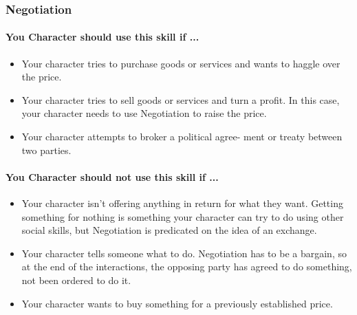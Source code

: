 \begin{multicols}{2}
\subsubsection{Negotiation}\label{skill:negotiation}
\paragraph{You Character should use this skill if ...}
\begin{itemize}
    \item Your character tries to purchase goods or services and wants to haggle
        over the price.
    \item Your character tries to sell goods or services and turn a profit. In
        this case, your character needs to use Negotiation to raise the price.
    \item Your character attempts to broker a political agree- ment or treaty
        between two parties.
\end{itemize}
\paragraph{You Character should not use this skill if ...}
\begin{itemize}
    \item Your character isn't offering anything in return for what they want.
        Getting something for nothing is something your character can try to do
        using other social skills, but Negotiation is predicated on the idea of
        an exchange.
    \item Your character tells someone what to do. Negotiation has to be a bargain,
        so at the end of the interactions, the opposing party has agreed to do
        something, not been ordered to do it.
    \item Your character wants to buy something for a previously established
        price.
\end{itemize}

\end{multicols}
\hrulefill
